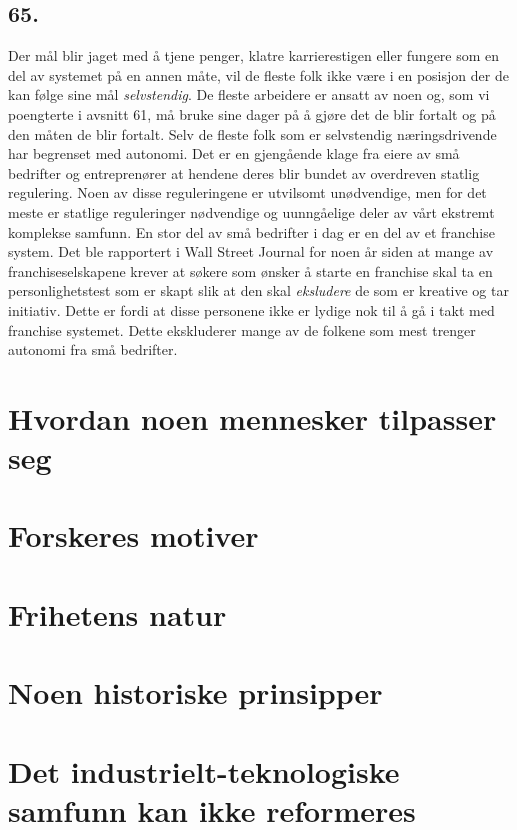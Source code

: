 \documentclass[oneside]{book}
\begin{document}
\section*{65.}
Der mål blir jaget med å tjene penger, klatre karrierestigen eller fungere som
en del av systemet på en annen måte, vil de fleste folk ikke være i en posisjon
der de kan følge sine mål \emph{selvstendig}. De fleste arbeidere er ansatt av
noen og, som vi poengterte i avsnitt 61, må bruke sine dager på å gjøre det de
blir fortalt og på den måten de blir fortalt. Selv de fleste folk som er
selvstendig næringsdrivende har begrenset med autonomi. Det er en gjengående
klage fra eiere av små bedrifter og entreprenører at hendene deres blir bundet
av overdreven statlig regulering. Noen av disse reguleringene er utvilsomt
unødvendige, men for det meste er statlige reguleringer nødvendige og
uunngåelige deler av vårt ekstremt komplekse samfunn. En stor del av små
bedrifter i dag er en del av et franchise system. Det ble rapportert i Wall
Street Journal for noen år siden at mange av franchiseselskapene krever at
søkere som ønsker å starte en franchise skal ta en personlighetstest som er
skapt slik at den skal \emph{eksludere} de som er kreative og tar initiativ.
Dette er fordi at disse personene ikke er lydige nok til å gå i takt med
franchise systemet. Dette ekskluderer mange av de folkene som mest trenger
autonomi fra små bedrifter.

\chapter{Hvordan noen mennesker tilpasser seg}

\chapter{Forskeres motiver}

\chapter{Frihetens natur}

\chapter{Noen historiske prinsipper}

\chapter{Det industrielt-teknologiske samfunn kan ikke reformeres}
\end{document}
